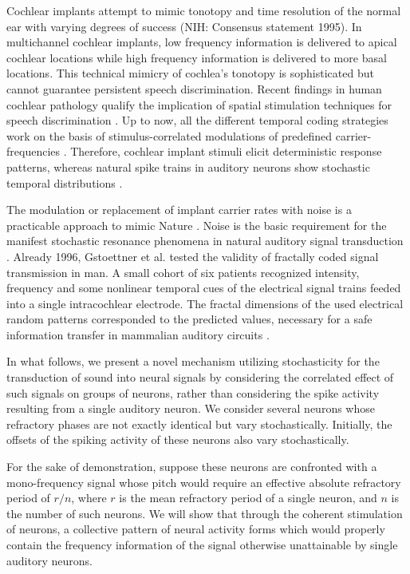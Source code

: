\documentclass[%
 preprint,
 showpacs,
 showkeys,
 preprintnumbers,
 amsmath,amssymb,
 aps,
 prl,
  longbibliography,
 ]{revtex4-1}
\begin{document}
Cochlear implants attempt to mimic tonotopy and time resolution
of the normal ear with varying degrees of success (NIH: Consensus statement 1995).
In multichannel cochlear implants, low frequency information
is delivered to apical cochlear locations while high frequency information is delivered
to more basal locations. This technical mimicry of cochlea's
tonotopy is sophisticated
but cannot guarantee persistent speech discrimination.
Recent findings in human cochlear pathology qualify the implication of spatial
stimulation techniques for speech discrimination \cite{khan-2005}.
Up to now, all the different temporal coding strategies work on the basis
of stimulus-correlated modulations of predefined carrier-frequencies \cite{wilson-03,rubinstein-2004}.
Therefore, cochlear implant stimuli elicit deterministic response patterns,
whereas natural spike trains in auditory neurons
show stochastic temporal distributions \cite{ehrenb-svozil,moore-2003}.

The modulation or replacement of implant carrier rates with noise is a practicable approach
to mimic Nature \cite{morse-1999,morse-1999b}.
Noise is the basic requirement for the manifest stochastic resonance phenomena
in natural auditory signal transduction \cite{ehrenb-svozil99}.
Already 1996, Gstoettner et al. \cite{gstoettner-1996} tested the validity of fractally coded signal transmission in man.
A small cohort of six patients recognized intensity,
frequency and some nonlinear temporal cues of the electrical signal trains
feeded into a single intracochlear electrode.
The fractal dimensions of the used electrical random patterns
corresponded to the predicted values,
necessary for a safe information transfer in mammalian auditory circuits \cite{svoz-ehr,svoz-ehr2}.

In what follows, we present a novel mechanism utilizing stochasticity
for the transduction of sound into neural signals by considering the correlated
effect of such signals on groups of neurons, rather than considering the spike activity resulting from
a single auditory neuron.
We consider several neurons whose refractory phases are not exactly identical but vary stochastically.
Initially, the offsets of the spiking activity of these neurons also vary stochastically.

For the sake of demonstration,
suppose these neurons are confronted with a mono-frequency signal whose pitch would require an
effective absolute refractory period of $r/n$, where $r$ is the mean refractory period
of a single neuron, and $n$ is the number of such neurons.
We will show that through the coherent stimulation of neurons,
a collective pattern of neural activity forms
which would properly contain the frequency information of the signal otherwise unattainable by single
auditory neurons.
\end{document}

